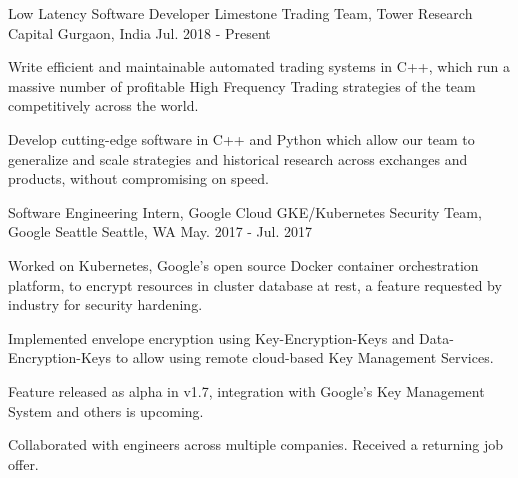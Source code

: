 
\vspace{-0.2cm}


\begin{cventries}

  \cventry
  {Low Latency Software Developer}
  {Limestone Trading Team, Tower Research Capital}
  {Gurgaon, India}
  {Jul. 2018 - Present}
  {
    \begin{cvitems}
    \setlength\itemsep{0.1cm}
    \item {Write efficient and maintainable automated trading systems in C++, which run a massive number of profitable High Frequency Trading strategies of the team competitively across the world.}
    \item {Develop cutting-edge software in C++ and Python which allow our team to generalize and scale strategies and historical research across \mbox{exchanges} and products, without compromising on speed.}
    \end{cvitems}
  }

  \cventry
  {Software Engineering Intern, Google Cloud}
  {GKE/Kubernetes Security Team, Google Seattle}
  {Seattle, WA}
  {May. 2017 - Jul. 2017}
  {
    \begin{cvitems}
    \setlength\itemsep{0.1cm}
    \item {Worked on Kubernetes, Google's open source Docker container orchestration platform, to encrypt resources in cluster database at rest, a feature requested by industry for security hardening.}
    \item {Implemented envelope encryption using Key-Encryption-Keys and Data-Encryption-Keys to allow using remote cloud-based Key Management Services.}
    \item {Feature released as alpha in v1.7, integration with Google's Key Management System and others is upcoming.}
    \item {Collaborated with engineers across multiple companies. Received a returning job offer.}
    \end{cvitems}
  }


\end{cventries}
